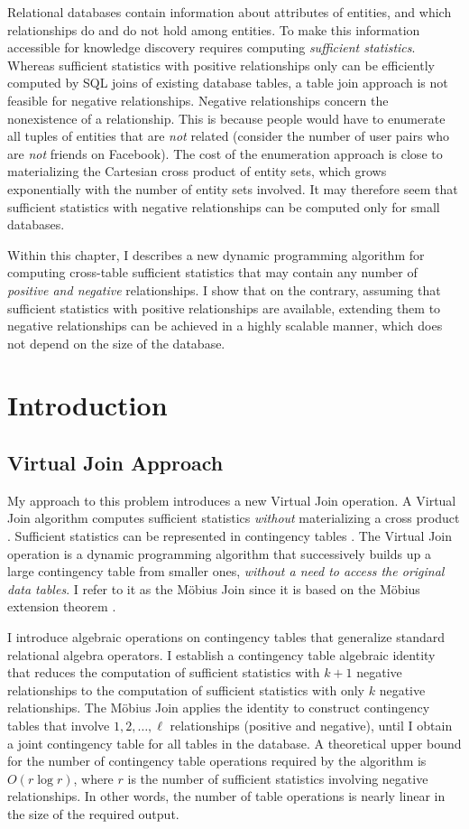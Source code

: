 \documentclass{sfuthesis}
\begin{document}
Relational databases contain information about attributes of entities, and which relationships do and do not hold among entities. To make this information accessible for knowledge discovery  requires computing {\em sufficient statistics}. 
Whereas sufficient statistics with positive relationships only can be efficiently computed by SQL joins of existing database tables, a table join approach is not feasible for negative relationships. Negative relationships concern the nonexistence of a relationship. This is because people would have to enumerate all tuples of entities that are {\em not} related (consider the number of user pairs who are {\em not} friends on Facebook). The cost of the enumeration approach is close to materializing the Cartesian cross product of entity sets, which grows exponentially with the number of entity sets involved. It may therefore seem that sufficient statistics with negative relationships can be computed only for small databases. 

Within this chapter, I describes a new dynamic programming algorithm for computing cross-table sufficient statistics that may contain any number of {\em positive and negative} relationships. I  show that on the contrary, assuming that sufficient statistics with positive relationships are available, extending them to negative relationships can be achieved in a highly scalable manner, which does not depend on the size of the database.
\section{Introduction} 

\subsection{Virtual Join Approach} My approach to this problem introduces a new Virtual Join operation. A Virtual Join algorithm computes sufficient statistics {\em without} materializing a cross product \cite{Yin2004}. Sufficient statistics can be represented in contingency tables \cite{Moore1998}. The Virtual Join operation is a dynamic programming algorithm that successively builds up a large contingency table from smaller ones, {\em without a need to access the original data tables}. I  refer to it as the M\"obius Join since it is based on the M\"obius extension theorem \cite{Schulte2014}.

I  introduce algebraic operations on contingency tables that generalize standard relational algebra operators. I  establish a contingency table algebraic identity that reduces the computation of sufficient statistics with $k+1$ negative relationships to the computation of sufficient statistics with only $k$ negative relationships. 
The M\"obius Join applies the identity to construct contingency tables that involve $1,2,\ldots,\ell$ relationships (positive and negative), until I  obtain a joint contingency table for all tables in the database. A theoretical upper bound for the number of contingency table operations required by the algorithm is $O(r \log r)$,  where $r$ is the number of sufficient statistics involving negative relationships. In other words, the number of table operations is nearly linear in the size of the required output. 
\end{document}
